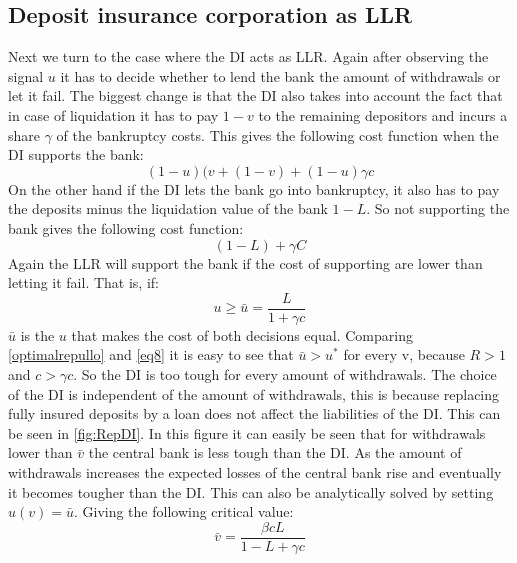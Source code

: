 \documentclass[twoside, 12pt]{article}
\numberwithin{equation}{section}
\begin{document}
\subsection{Deposit insurance corporation as LLR}
Next we turn to the case where the DI acts as LLR. Again after observing the signal $u$ it has to decide whether to lend the bank the amount of withdrawals or let it fail. The biggest change is that the DI also takes into account the fact that in case of liquidation it has to pay $1-v$ to the remaining depositors and incurs a share $\gamma$ of the bankruptcy costs. This gives the following cost function when the DI supports the bank:
\begin{equation}
(1-u)(v+(1-v)+(1-u)\gamma c
\end{equation}
On the other hand if the DI lets the bank go into bankruptcy, it also has to pay the deposits minus the liquidation value of the bank $1-L$. So not supporting the bank gives the following cost function:
\begin{equation}
(1-L)+\gamma C
\end{equation}
Again the LLR will support the bank if the cost of supporting are lower than letting it fail. That is, if: 
\begin{equation} \label{eq8}
u\geq \bar{u}= \frac{L}{1+\gamma c}
\end{equation}
$\bar{u}$ is the $u$ that makes the cost of both decisions equal. Comparing \eqref{optimalrepullo} and \eqref{eq8} it is easy to see that $\bar{u}>u^*$ for every v, because $R>1$ and $c>\gamma c$. So the DI is too tough for every amount of withdrawals. The choice of the DI is independent of the amount of withdrawals, this is because replacing fully insured deposits by a loan does not affect the liabilities of the DI. This can be seen in \autoref{fig:RepDI}. In this figure it can easily be seen that for withdrawals lower than $\bar{v}$ the central bank is less tough than the DI. As the amount of withdrawals increases the expected losses of the central bank rise and eventually it becomes tougher than the DI. This can also be analytically solved by setting $\hat{u}(v)=\bar{u}$. Giving the following critical value:
\begin{equation} \label{eq9}
\bar{v}= \frac{\beta cL}{1-L+\gamma c}
\end{equation}
\end{document}

